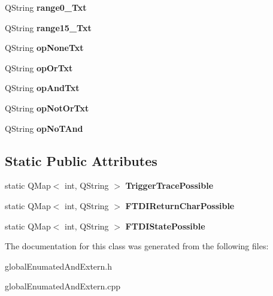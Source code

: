 \begin{DoxyCompactItemize}
\mbox{\label{class_global_enumated_and_extern_af1c7900c3aa9912be038cbba1b8c2b58}} 
Q\+String {\bfseries range0\+\_\+Txt}
\item 
\mbox{\label{class_global_enumated_and_extern_a16bd134d1864f480d7d5f48ffa5afe9d}} 
Q\+String {\bfseries range15\+\_\+Txt}
\item 
\mbox{\label{class_global_enumated_and_extern_af22bf56c5e5919e4d8015d58162534ea}} 
Q\+String {\bfseries op\+None\+Txt}
\item 
\mbox{\label{class_global_enumated_and_extern_a0eaa8293b1f94e652d022f3431a6a840}} 
Q\+String {\bfseries op\+Or\+Txt}
\item 
\mbox{\label{class_global_enumated_and_extern_a187e9b46265c3b1c817e36bbb661705c}} 
Q\+String {\bfseries op\+And\+Txt}
\item 
\mbox{\label{class_global_enumated_and_extern_a56c5d6220c7099ff21a570b8534eb99a}} 
Q\+String {\bfseries op\+Not\+Or\+Txt}
\item 
\mbox{\label{class_global_enumated_and_extern_a0da3df83132ecd4bd1a8021f9ef93628}} 
Q\+String {\bfseries op\+No\+T\+And}
\end{DoxyCompactItemize}
\subsection*{Static Public Attributes}
\begin{DoxyCompactItemize}
\item 
\mbox{\label{class_global_enumated_and_extern_a1f9efd6c1b2c316e8dae8a8d42aaa416}} 
static Q\+Map$<$ int, Q\+String $>$ {\bfseries Trigger\+Trace\+Possible}
\item 
\mbox{\label{class_global_enumated_and_extern_a147de86b95d1ee3efb121901bc43c67a}} 
static Q\+Map$<$ int, Q\+String $>$ {\bfseries F\+T\+D\+I\+Return\+Char\+Possible}
\item 
\mbox{\label{class_global_enumated_and_extern_aeae501d34ab48ca2647ba68bc94d59fd}} 
static Q\+Map$<$ int, Q\+String $>$ {\bfseries F\+T\+D\+I\+State\+Possible}
\end{DoxyCompactItemize}


The documentation for this class was generated from the following files\+:\begin{DoxyCompactItemize}
\item 
global\+Enumated\+And\+Extern.\+h\item 
global\+Enumated\+And\+Extern.\+cpp\end{DoxyCompactItemize}
